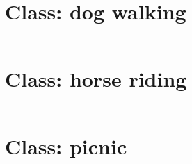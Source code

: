 \inputminted[linenos]{sql}{code/biking.txt}
\clearpage

\section{Class: dog walking}

\inputminted[linenos]{sql}{code/dog_walking.txt}
\clearpage

\section{Class: horse riding}

\inputminted[linenos]{sql}{code/horse_riding.txt}
\clearpage

\section{Class: picnic}

\inputminted[linenos]{sql}{code/picnic.txt}
\clearpage



